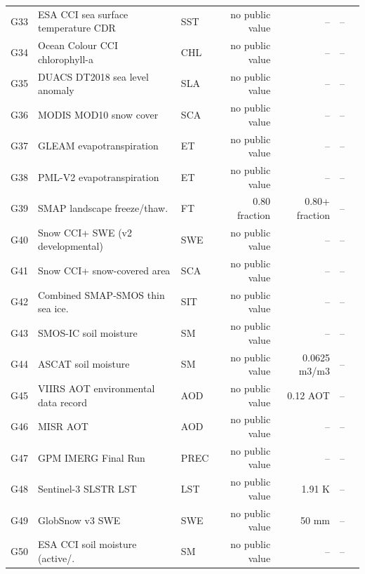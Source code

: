 \begin{longtable}{@{}l p{2.4cm} l r r r p{2.3cm}@{}}
G33 & ESA CCI sea surface temperature CDR & SST & no public value & -- & -- & \citep{alerskans2020} \\
G34 & Ocean Colour CCI chlorophyll-a & CHL & no public value & -- & -- & \citep{sathyendranath2019} \\
G35 & DUACS DT2018 sea level anomaly & SLA & no public value & -- & -- & \citep{taburet2019} \\
G36 & MODIS MOD10 snow cover & SCA & no public value & -- & -- & \citep{ault2006} \\
G37 & GLEAM evapotranspiration & ET & no public value & -- & -- & \citep{yang2017} \\
G38 & PML-V2 evapotranspiration & ET & no public value & -- & -- & \citep{wu2023} \\
G39 & SMAP landscape freeze\slash thaw. & FT & 0.80 fraction & 0.80+ fraction & -- & \citep{derksen2017} \\
G40 & Snow CCI+ SWE (v2 developmental) & SWE & no public value & -- & -- & \citep{mortimer2022} \\
G41 & Snow CCI+ snow-covered area & SCA & no public value & -- & -- & \citep{sun2025} \\
G42 & Combined SMAP-SMOS thin sea ice. & SIT & no public value & -- & -- & \citep{patilea2019} \\
G43 & SMOS-IC soil moisture & SM & no public value & -- & -- & \citep{fernandezmoran2017} \\
G44 & ASCAT soil moisture & SM & no public value & 0.0625 m3/m3 & -- & \citep{wagner2013,kim2018} \\
G45 & VIIRS AOT environmental data record & AOD & no public value & 0.12 AOT & -- & \citep{huang2016} \\
G46 & MISR AOT & AOD & no public value & -- & -- & \citep{kahn2005} \\
G47 & GPM IMERG Final Run & PREC & no public value & -- & -- & \citep{li2026} \\
G48 & Sentinel-3 SLSTR LST & LST & no public value & 1.91 K & -- & \citep{gao2024} \\
G49 & GlobSnow v3 SWE & SWE & no public value & 50 mm & -- & \citep{mortimer2020} \\
G50 & ESA CCI soil moisture (active\slash. & SM & no public value & -- & -- & \citep{alyaari2018} \\
\bottomrule
\end{longtable}
